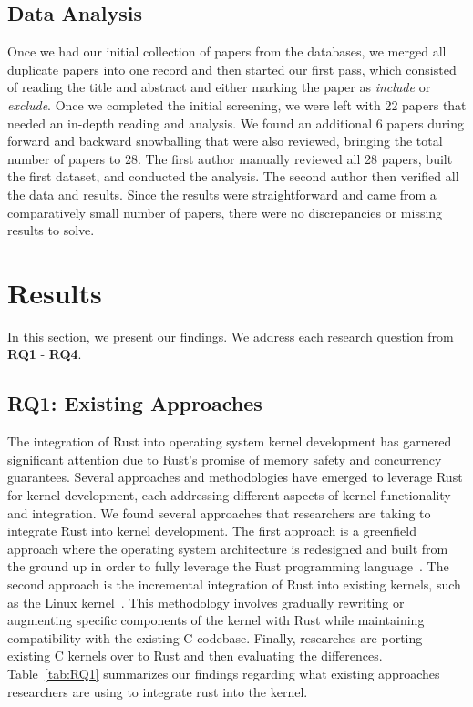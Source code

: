 \documentclass[sigconf]{acmart}
\begin{document}
\subsection{Data Analysis}

Once we had our initial collection of papers from the databases, we merged all duplicate papers into one record and then started our first pass, which consisted of reading the title and abstract and either marking the paper as \textit{include} or \textit{exclude}. Once we completed the initial screening, we were left with 22 papers that needed an in-depth reading and analysis. We found an additional 6 papers during forward and backward snowballing that were also reviewed, bringing the total number of papers to 28. The first author manually reviewed all 28 papers, built the first dataset, and conducted the analysis. The second author then verified all the data and results. Since the results were straightforward and came from a comparatively small number of papers, there were no discrepancies or missing results to solve.

\section{Results}

In this section, we present our findings. We address each research question from \textbf{RQ1} - \textbf{RQ4}.

\subsection{RQ1: Existing Approaches}

The integration of Rust into operating system kernel development has garnered significant attention
due to Rust's promise of memory safety and concurrency guarantees. Several approaches and
methodologies have emerged to leverage Rust for kernel development, each addressing different
aspects of kernel functionality and integration.  We found several approaches that researchers are
taking to integrate Rust into kernel development. The first approach is a greenfield approach
where the operating system architecture is redesigned and built from the ground up in order to fully
leverage the Rust programming language~\cite{Culic2022-bk, Boos2020-zh}. The second approach is the incremental integration of Rust
into existing kernels, such as the Linux
kernel~\cite{The_kernel_development_community_undated-iw, Miller2021-pg, Oikawa2023-ms}. This methodology involves gradually
rewriting or augmenting specific components of the kernel with Rust while maintaining compatibility
with the existing C codebase. Finally, researches are porting existing C kernels over to Rust and then evaluating the differences. Table~\ref{tab:RQ1} summarizes our findings regarding what existing
approaches researchers are using to integrate rust into the kernel.
\end{document}
